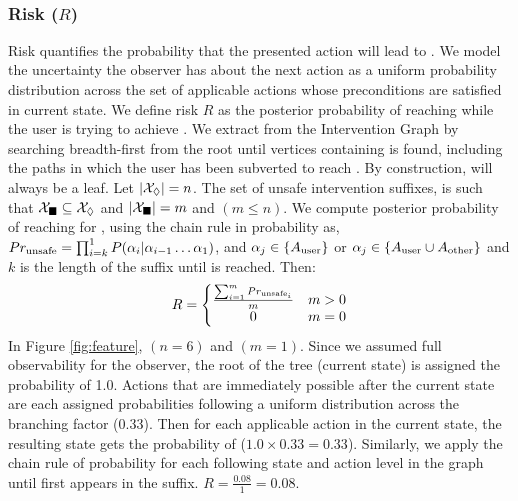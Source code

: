 ~\subsubsection{Risk ($R$)}
Risk quantifies the probability that the presented action will lead to \undesired.
We model the uncertainty the observer has about the next action as a uniform probability distribution across the set of applicable actions whose preconditions are satisfied in current state. 
We define risk $R$ as the posterior probability of reaching \undesired while the user is trying to achieve \desired. 
We extract \Suffixes from the Intervention Graph by searching breadth-first from the root until vertices containing \desired is found, including the paths in which the user has been subverted to reach \undesired. 
By construction, \desired will always be a leaf.
Let $\left | \mathcal{X}_\Diamond \right |=n$. 
The set of unsafe intervention suffixes, \SuffixesUnsafe is such that $\mathcal{X}_{\blacksquare} \subseteq \mathcal{X}_\Diamond$ and $\left | \mathcal{X}_{\blacksquare} \right |=m$ and $(m\leq n)$.
We compute posterior probability of reaching \undesired for \SuffixesUnsafe, using the chain rule in probability as, 
$Pr_{\textnormal{unsafe}}=\prod_{i=k}^{1}P(\alpha_i|\alpha_{i-1}\ldots \alpha_1)$, and $\alpha_{j} \in \lbrace A_{\textnormal{user}}\rbrace$ or $\alpha_j\in\lbrace A_{\textnormal{user}}\cup A_{\textnormal{other}}\rbrace$ and $k$ is the length of the suffix until \undesired is reached. Then: 
\begin{equation*} 
R = \left\{\begin{matrix} \frac{\sum_{i=1}^{m}Pr_{\textnormal{unsafe}_i}}{m} & m>0\\ 0 &  m=0 \end{matrix}\right.
\end{equation*}
In Figure \ref{fig:feature}, $(n=6)$ and $(m=1)$. 
Since we assumed full observability for the observer, the root of the tree (current state) is assigned the probability of 1.0. 
Actions that are immediately possible after the current state are each assigned probabilities following a uniform distribution across the branching factor (0.33). 
Then for each applicable action in the current state, the resulting state gets the probability of ($1.0\times0.33=0.33$). 
Similarly, we apply the chain rule of probability for each following state and action level in the graph until \undesired first appears in the suffix. $R=\frac{0.08}{1}=0.08$.

